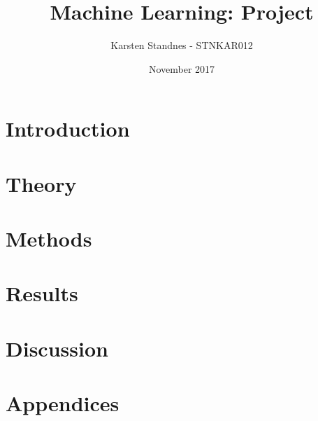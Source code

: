 \documentclass{article}
\title{Machine Learning: Project }
\author{Karsten Standnes - STNKAR012}
\date{November 2017}
\begin{document}
	
	\maketitle
	\setlength\parindent{0pt}

	\section{Introduction}
	
	
	
	\newpage
	\tableofcontents
	\newpage 
	 
	\section{Theory}
	
	
	 
	\section{Methods}
	
	
	
	\section{Results}\label{Results}
	
	
	
	\section{Discussion}
	
	
	
	\newpage
	\section{Appendices}
	
	\selectfont
	
	
\end{document}
